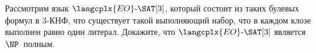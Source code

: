 Рассмотрим язык $\langcplx{EO}\text{-}\SAT[3]$, который состоит из таких булевых формул в $3$-КНФ, что
существует такой выполняющий набор, что в каждом клозе выполнен равно один литерал. Докажите, что
$\langcplx{EO}\text{-}\SAT[3]$ является $\NP$~полным.

